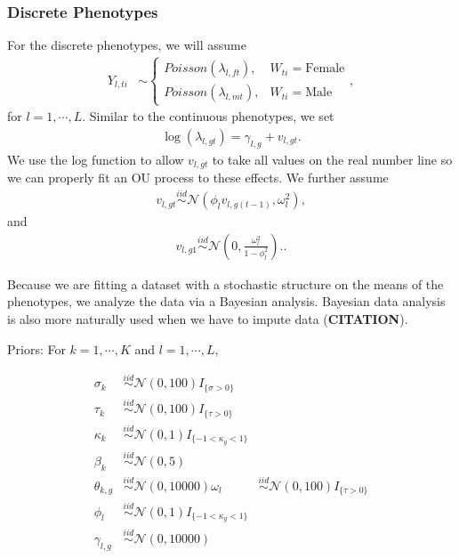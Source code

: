 \documentclass[
  12pt,
]{article}
\begin{document}
\hypertarget{discrete-phenotypes}{%
\subsubsection{Discrete Phenotypes}\label{discrete-phenotypes}}

For the discrete phenotypes, we will assume \begin{align}
{Y}_{l,ti} & \sim \left\{\begin{array}{ll} Poisson(\lambda_{l,ft}), & W_{ti} = \text{Female} \\ Poisson(\lambda_{l,mt}), & W_{ti} = \text{Male} \end{array}\right.,
\label{eq:Y}
\end{align} for \(l = 1,\cdots,L\). Similar to the continuous
phenotypes, we set \begin{align}
\log(\lambda_{l,gt}) = \gamma_{l,g} + v_{l,gt}.
\label{eq:lambda}
\end{align} We use the log function to allow \(v_{l,gt}\) to take all
values on the real number line so we can properly fit an OU process to
these effects. We further assume \begin{align}
v_{l,gt} \overset{iid}{\sim}\mathcal{N}(\phi_{l} v_{l,g(t-1)} , \omega_l^2),
\label{eq:v_ar1}
\end{align} and \begin{align}
v_{l,g1} \overset{iid}{\sim}\mathcal{N}\left(0,\frac{\omega_l^2}{1 - \phi_{l}^2}\right)..
\label{eq:v1}
\end{align}

Because we are fitting a dataset with a stochastic structure on the
means of the phenotypes, we analyze the data via a Bayesian analysis.
Bayesian data analysis is also more naturally used when we have to
impute data (\textbf{CITATION}).

Priors: For \(k = 1,\cdots,K\) and \(l = 1,\cdots,L\),

\begin{align}
\sigma_k & \overset{iid}{\sim}\mathcal{N}(0,100)I_{\{\sigma > 0\}} \nonumber \\
\tau_k & \overset{iid}{\sim}\mathcal{N}(0,100)I_{\{\tau > 0\}} \nonumber \\
\kappa_k & \overset{iid}{\sim}\mathcal{N}(0,1)I_{\{-1 < \kappa_g < 1\}} \nonumber \\
\beta_k & \overset{iid}{\sim}\mathcal{N}(0,5) \\
\theta_{k,g} & \overset{iid}{\sim}\mathcal{N}(0,10000)
\omega_l & \overset{iid}{\sim}\mathcal{N}(0,100)I_{\{\tau > 0\}} \nonumber \\
\phi_l & \overset{iid}{\sim}\mathcal{N}(0,1)I_{\{-1 < \kappa_g < 1\}} \nonumber \\
\gamma_{l,g} & \overset{iid}{\sim}\mathcal{N}(0,10000)
\label{eq:priors}
\end{align}
\end{document}
